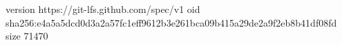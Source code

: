 version https://git-lfs.github.com/spec/v1
oid sha256:e4a5a5dcd0d3a2a57fc1eff9612b3e261bca09b415a29de2a9f2eb8b41df08fd
size 71470
